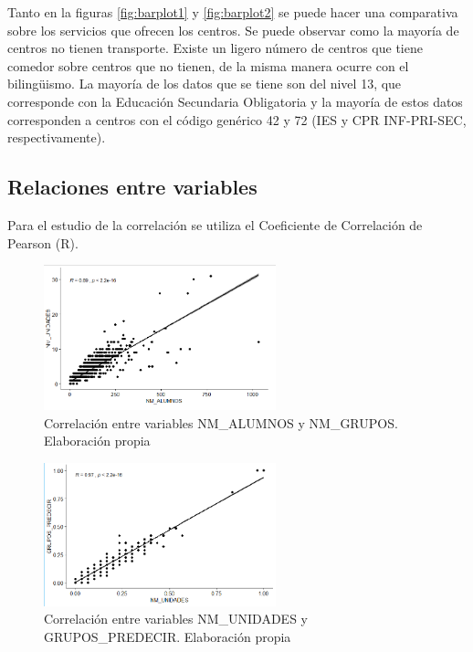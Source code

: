 \begin{subappendices}
Tanto en la figuras \ref{fig:barplot1} y \ref{fig:barplot2} se puede hacer una comparativa sobre los servicios que ofrecen los centros. Se puede observar como la mayoría de centros no tienen transporte. Existe un ligero número de centros que tiene comedor sobre centros que no tienen, de la misma manera ocurre con el bilingüismo. La mayoría de los datos que se tiene son del nivel 13, que corresponde con la Educación Secundaria Obligatoria y la mayoría de estos datos corresponden a centros con el código genérico 42 y 72 (IES y CPR INF-PRI-SEC, respectivamente).

\subsection{Relaciones entre variables}
	\label{appendix:AB2}
Para el estudio de la correlación se utiliza el Coeficiente de Correlación de Pearson (R).

\begin{figure}[htb]
	\centering
	\caption{Correlación entre variables NM\_ALUMNOS y NM\_GRUPOS. Elaboración propia}
	\label{fig:relacionAlumnGrup}
	\includegraphics[width=0.6\textwidth]{recursos/ImagenesR/RelacionAlumnGrupos}
	
\end{figure}
\FloatBarrier

\begin{figure}[htb]
	\centering
	\caption{Correlación entre variables NM\_UNIDADES y GRUPOS\_PREDECIR. Elaboración propia}
	\label{fig:RelacionGruposYUnidades}
	\includegraphics[width=0.6\textwidth]{recursos/ImagenesR/RelacionGruposYUnidades}
	

\end{figure}
\end{subappendices}
